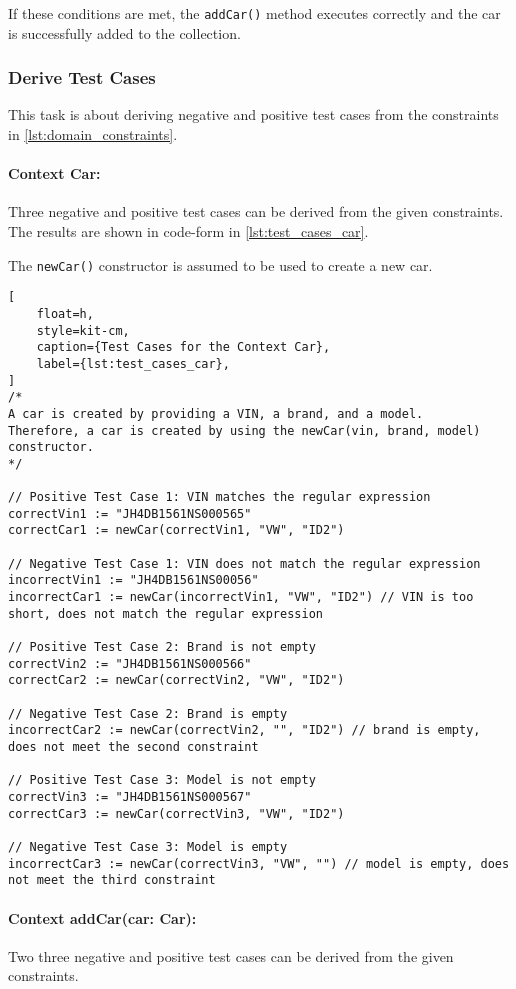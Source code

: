 If these conditions are met, the \texttt{addCar()} method executes correctly and the car is successfully added to the collection.

\subsubsection*{Derive Test Cases}
This task is about deriving negative and positive test cases from the constraints in \autoref{lst:domain_constraints}.

\paragraph*{Context Car:}
Three negative and positive test cases can be derived from the given constraints.
The results are shown in code-form in \autoref{lst:test_cases_car}.

The \texttt{newCar()} constructor is assumed to be used to create a new car.

\begin{lstlisting}[
    float=h,
    style=kit-cm,
    caption={Test Cases for the Context Car},
    label={lst:test_cases_car}, 
]
/*
A car is created by providing a VIN, a brand, and a model.
Therefore, a car is created by using the newCar(vin, brand, model) constructor.
*/

// Positive Test Case 1: VIN matches the regular expression
correctVin1 := "JH4DB1561NS000565"
correctCar1 := newCar(correctVin1, "VW", "ID2")

// Negative Test Case 1: VIN does not match the regular expression
incorrectVin1 := "JH4DB1561NS00056"
incorrectCar1 := newCar(incorrectVin1, "VW", "ID2") // VIN is too short, does not match the regular expression

// Positive Test Case 2: Brand is not empty
correctVin2 := "JH4DB1561NS000566"
correctCar2 := newCar(correctVin2, "VW", "ID2")

// Negative Test Case 2: Brand is empty
incorrectCar2 := newCar(correctVin2, "", "ID2") // brand is empty, does not meet the second constraint

// Positive Test Case 3: Model is not empty
correctVin3 := "JH4DB1561NS000567"
correctCar3 := newCar(correctVin3, "VW", "ID2")

// Negative Test Case 3: Model is empty
incorrectCar3 := newCar(correctVin3, "VW", "") // model is empty, does not meet the third constraint
\end{lstlisting}

\paragraph*{Context addCar(car: Car):}
Two three negative and positive test cases can be derived from the given constraints.


